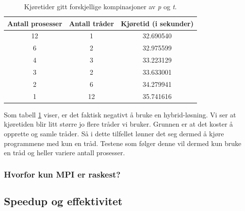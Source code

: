 \documentclass{article}
\begin{document}
\begin{table}
\begin{center}
	
	\begin{tabular}{c | c | c}
	\hline \hline 
	Antall prosesser      &    Antall tråder     &    Kjøretid (i sekunder) 	    \\ \hline	
	12		      &		1	     &	  32.690540       		    \\ \hline
	6		      &         2	     &    32.975599       		    \\ \hline
	4		      &         3	     &    33.223129	    		    \\ \hline
	3   		      &		2	     &    33.633001	    		    \\ \hline
	2		      &         6	     &    34.279941	    		    \\ \hline
	1		      &		12	     &    35.741616	    		    \\ \hline
	
	\end{tabular}
\end{center}
\caption{Kjøretider gitt forskjellige kompinasjoner av \emph{p} og \emph{t}.}
\label{p/t-table}
\end{table}

Som tabell \ref{p/t-table} viser, er det faktisk negativt å bruke en hybrid-løsning. Vi ser at kjøretiden blir litt større jo flere tråder vi bruker. Grunnen er at det koster å opprette og samle tråder. Så i dette tilfellet lønner det seg dermed å kjøre programmene med kun en tråd. 
Testene som følger denne vil dermed kun bruke en tråd og heller variere antall prosesser. 

\subsubsection{Hvorfor kun MPI er raskest?}

\subsection{Speedup og effektivitet}
\end{document}
